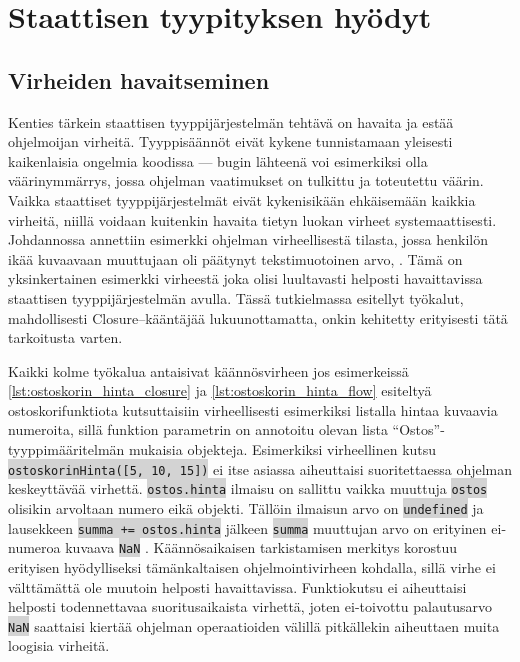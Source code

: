 \chapter{Staattisen tyypityksen hyödyt}

\section{Virheiden havaitseminen}

Kenties tärkein staattisen tyyppijärjestelmän tehtävä on havaita ja estää
ohjelmoijan virheitä. Tyyppisäännöt eivät kykene tunnistamaan yleisesti
kaikenlaisia ongelmia koodissa — bugin lähteenä voi esimerkiksi olla
väärinymmärrys, jossa ohjelman vaatimukset on tulkittu ja toteutettu väärin.
Vaikka staattiset tyyppijärjestelmät eivät kykenisikään ehkäisemään kaikkia
virheitä, niillä voidaan kuitenkin havaita tietyn luokan virheet
systemaattisesti. Johdannossa annettiin esimerkki ohjelman virheellisestä
tilasta, jossa henkilön ikää kuvaavaan muuttujaan oli päätynyt tekstimuotoinen
arvo, . Tämä on yksinkertainen esimerkki virheestä joka
olisi luultavasti helposti havaittavissa staattisen tyyppijärjestelmän
avulla. Tässä tutkielmassa esitellyt työkalut, mahdollisesti Closure–kääntäjää
lukuunottamatta, onkin kehitetty erityisesti tätä tarkoitusta
varten.

Kaikki kolme työkalua antaisivat käännösvirheen jos esimerkeissä
\ref{lst:ostoskorin_hinta_closure} ja \ref{lst:ostoskorin_hinta_flow}
esiteltyä ostoskorifunktiota kutsuttaisiin virheellisesti esimerkiksi listalla
hintaa kuvaavia numeroita, sillä funktion parametrin on annotoitu olevan
lista ``Ostos''-tyyppimääritelmän mukaisia objekteja. Esimerkiksi
virheellinen kutsu
\colorbox{lightgray}{\lstinline|ostoskorinHinta([5, 10, 15])|} ei itse
asiassa aiheuttaisi suoritettaessa ohjelman keskeyttävää virhettä.
\colorbox{lightgray}{\lstinline|ostos.hinta|} ilmaisu on sallittu vaikka
muuttuja \colorbox{lightgray}{\lstinline|ostos|} olisikin arvoltaan numero
eikä objekti. Tällöin ilmaisun arvo on \colorbox{lightgray}{\lstinline|undefined|}
ja lausekkeen \colorbox{lightgray}{\lstinline|summa += ostos.hinta|} jälkeen
\colorbox{lightgray}{\lstinline|summa|} muuttujan arvo on erityinen
ei-numeroa kuvaava \colorbox{lightgray}{\lstinline|NaN|} \cite{Ecma262NaN}.
Käännösaikaisen tarkistamisen merkitys korostuu erityisen hyödylliseksi
tämänkaltaisen ohjelmointivirheen kohdalla, sillä virhe ei välttämättä ole
muutoin helposti havaittavissa. Funktiokutsu ei aiheuttaisi helposti
todennettavaa suoritusaikaista virhettä, joten ei-toivottu palautusarvo
\colorbox{lightgray}{\lstinline|NaN|} saattaisi kiertää ohjelman
operaatioiden välillä pitkällekin aiheuttaen muita loogisia virheitä.

